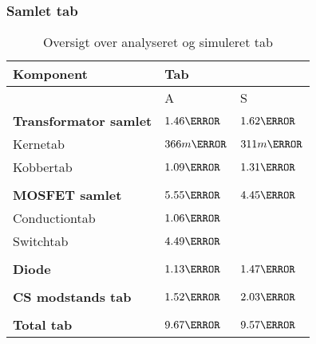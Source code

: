 \subsubsection{Samlet tab}
\begin{table}[H] 			
	\centering
	\begin{tabularx}{\textwidth}{|X|l|l|}
		\hline
		\textbf{\large Komponent} & \multicolumn{2}{|X|}{\textbf{\large Tab}} \\ \hline
		& A & S	\\ \hline
		\textbf{Transformator samlet} & $1.46\watt$ & $1.62\watt$ \\ \hline 
		Kernetab & $366m\watt$ & $311m\watt$ \\ \hline
		Kobbertab & $1.09\watt$ & $1.31\watt$ \\ \hline
		& &	\\ \hline
		\textbf{MOSFET samlet} & $5.55\watt$ & $4.45\watt$ \\ \hline
		Conductiontab & $1.06\watt$ & \\ \hline
		Switchtab & $4.49\watt$ & \\ \hline
		& &	\\ \hline
		\textbf{Diode} & $1.13\watt$ & $1.47\watt$ \\ \hline
		& &	\\ \hline
		\textbf{CS modstands tab} & $1.52\watt$ & $2.03\watt$ \\ \hline
		& &	\\ \hline
		\textbf{Total tab} & $9.67\watt$ & $9.57\watt$ \\ \hline
	\end{tabularx}
	\caption{Oversigt over analyseret og simuleret tab}
	\label{tab:anasim}
\end{table}